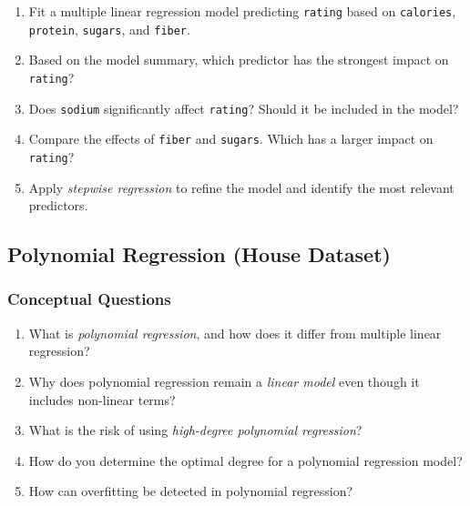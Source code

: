 \documentclass[
]{book}
\newcommand{\passthrough}[1]{#1}
\providecommand{\tightlist}{%
  \setlength{\itemsep}{0pt}\setlength{\parskip}{0pt}}
\theoremstyle{definition}
\theoremstyle{definition}
\theoremstyle{definition}
\theoremstyle{definition}
\theoremstyle{remark}
\begin{document}
\begin{enumerate}
\def\labelenumi{\arabic{enumi}.}
\setcounter{enumi}{19}
\tightlist
\item
  Fit a multiple linear regression model predicting \passthrough{\lstinline!rating!} based on \passthrough{\lstinline!calories!}, \passthrough{\lstinline!protein!}, \passthrough{\lstinline!sugars!}, and \passthrough{\lstinline!fiber!}.\\
\item
  Based on the model summary, which predictor has the strongest impact on \passthrough{\lstinline!rating!}?\\
\item
  Does \passthrough{\lstinline!sodium!} significantly affect \passthrough{\lstinline!rating!}? Should it be included in the model?\\
\item
  Compare the effects of \passthrough{\lstinline!fiber!} and \passthrough{\lstinline!sugars!}. Which has a larger impact on \passthrough{\lstinline!rating!}?\\
\item
  Apply \emph{stepwise regression} to refine the model and identify the most relevant predictors.
\end{enumerate}

\subsection*{Polynomial Regression (House Dataset)}\label{polynomial-regression-house-dataset}

\subsubsection*{Conceptual Questions}\label{conceptual-questions-7}

\begin{enumerate}
\def\labelenumi{\arabic{enumi}.}
\setcounter{enumi}{24}
\tightlist
\item
  What is \emph{polynomial regression}, and how does it differ from multiple linear regression?\\
\item
  Why does polynomial regression remain a \emph{linear model} even though it includes non-linear terms?\\
\item
  What is the risk of using \emph{high-degree polynomial regression}?\\
\item
  How do you determine the optimal degree for a polynomial regression model?\\
\item
  How can overfitting be detected in polynomial regression?
\end{enumerate}
\end{document}
